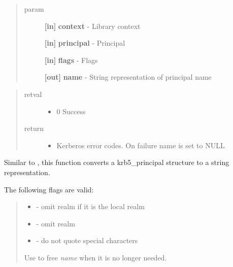 \documentclass[letterpaper,10pt,english]{sphinxmanual}
\begin{document}
\begin{quote}\begin{description}
\item[{param}] \leavevmode
\textbf{{[}in{]}} \textbf{context} - Library context

\textbf{{[}in{]}} \textbf{principal} - Principal

\textbf{{[}in{]}} \textbf{flags} - Flags

\textbf{{[}out{]}} \textbf{name} - String representation of principal name

\end{description}\end{quote}
\begin{quote}\begin{description}
\item[{retval}] \leavevmode\begin{itemize}
\item {} 
0   Success

\end{itemize}

\item[{return}] \leavevmode\begin{itemize}
\item {} 
Kerberos error codes. On failure name is set to NULL

\end{itemize}

\end{description}\end{quote}

Similar to {\hyperref[appdev/refs/api/krb5_unparse_name:krb5_unparse_name]{}} , this function converts a krb5\_principal structure to a string representation.

The following flags are valid:
\begin{quote}
\begin{itemize}
\item {} 
{\hyperref[appdev/refs/macros/KRB5_PRINCIPAL_UNPARSE_SHORT:KRB5_PRINCIPAL_UNPARSE_SHORT]{}} - omit realm if it is the local realm

\item {} 
{\hyperref[appdev/refs/macros/KRB5_PRINCIPAL_UNPARSE_NO_REALM:KRB5_PRINCIPAL_UNPARSE_NO_REALM]{}} - omit realm

\item {} 
{\hyperref[appdev/refs/macros/KRB5_PRINCIPAL_UNPARSE_DISPLAY:KRB5_PRINCIPAL_UNPARSE_DISPLAY]{}} - do not quote special characters

\end{itemize}

Use {\hyperref[appdev/refs/api/krb5_free_unparsed_name:krb5_free_unparsed_name]{}} to free \emph{name} when it is no longer needed.
\end{quote}
\end{document}
